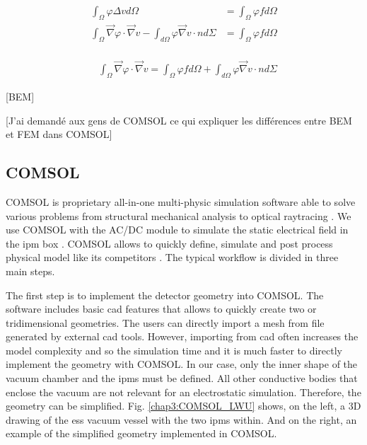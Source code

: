 \begin{refsection}
	[FEM]
	\begin{align}
		\int_{\Omega}^{} \varphi \Delta v d\Omega                                                                             & = \int_{\Omega}^{} \varphi f d\Omega \\
		\int_{\Omega}^{} \vec{\nabla} \varphi \cdot \vec{\nabla} v - \int_{d\Omega}^{} \varphi \vec{\nabla} v \cdot n d\Sigma & = \int_{\Omega}^{} \varphi f d\Omega
	\end{align}

	\begin{align}                                                      \\
		 & \int_{\Omega}^{} \vec{\nabla} \varphi \cdot \vec{\nabla} v = \int_{\Omega}^{} \varphi f d\Omega + \int_{d\Omega}^{} \varphi \vec{\nabla} v \cdot n d\Sigma
	\end{align}

	[BEM]

	[J'ai demandé aux gens de COMSOL ce qui expliquer les différences entre BEM et FEM dans COMSOL]

	

	\subsection{COMSOL}
	COMSOL is proprietary all-in-one multi-physic simulation software able to solve various problems from structural mechanical analysis to optical raytracing \cite{comsol2018}. We use COMSOL with the AC/DC module to simulate the static electrical field in the \acrshort{ipm} box \cite{comsolacdc2018}. COMSOL allows to quickly define, simulate and post process physical model like its competitors \cite{cststudio2018,ansys2018,couloumb2018}. The typical workflow is divided in three main steps.

	The first step is to implement the detector geometry into COMSOL. The software includes basic \acrshort{cad} features that allows to quickly create two or tridimensional geometries. The users can directly import a mesh from file generated by external \acrshort{cad} tools. However, importing from \acrshort{cad} often increases the model complexity and so the simulation time and it is much faster to directly implement the geometry with COMSOL.  In our case, only the inner shape of the vacuum chamber and the \acrshort{ipm}s must be defined. All other conductive bodies that enclose the vacuum are not relevant for an electrostatic simulation. Therefore, the geometry can be simplified. Fig. \ref{chap3:COMSOL_LWU} shows, on the left, a 3D drawing of the \acrshort{ess} vacuum vessel with the two \acrshort{ipm}s within. And on the right, an example of the simplified geometry implemented in COMSOL.


\end{refsection}
